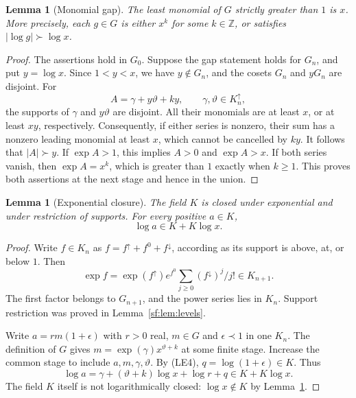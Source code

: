 \documentclass[11pt]{article}
\newtheorem{lemma}[theorem]{Lemma}
\theoremstyle{definition}
\theoremstyle{remark}
\newcommand{\up}{\uparrow}
\newcommand{\dn}{\downarrow}
\newcommand{\Z}{\mathbb Z}
\numberwithin{equation}{section}
\begin{document}
\begin{lemma}[Monomial gap]\label{sf:lem:gap}
The least monomial of $G$ strictly greater than $1$ is $x$.
More precisely, each $g\in G$ is either $x^k$ for some $k\in\Z$,
or satisfies $|\log g|\succ\log x$.
\end{lemma}
\begin{proof}
The assertions hold in $G_0$. Suppose the gap statement holds for
$G_n$, and put $y=\log x$. Since $1<y<x$, we have $y\notin G_n$,
and the cosets $G_n$ and $yG_n$ are disjoint. For
\[
 A=\gamma+y\vartheta+ky,\qquad\gamma,\vartheta\in K_n^\up,
\]
the supports of $\gamma$ and $y\vartheta$ are disjoint. All
their monomials are at least $x$, or at least $xy$, respectively.
Consequently, if either series is nonzero, their sum has a nonzero
leading monomial at least $x$, which cannot be cancelled by $ky$.
It follows that $|A|\succ y$. If $\exp A>1$, this implies
$A>0$ and $\exp A>x$. If both series vanish, then
$\exp A=x^k$, which is greater than $1$ exactly when $k\ge1$.
This proves both assertions at the next stage and hence in the union.
\end{proof}

\begin{lemma}[Exponential closure]\label{sf:lem:expclosure}
The field $K$ is closed under exponential and under restriction of
supports. For every positive $a\in K$,
\[
 \log a\in K+K\log x.
\]
\end{lemma}
\begin{proof}
Write $f\in K_n$ as $f=f^\up+f^0+f^\dn$, according as its
support is above, at, or below $1$. Then
\[
 \exp f=\exp(f^\up)e^{f^0}
                      \sum_{j\ge0}(f^\dn)^j/j!\in K_{n+1}.
\]
The first factor belongs to $G_{n+1}$, and the power series lies
in $K_n$. Support restriction was proved in Lemma~\ref{sf:lem:levels}.

Write $a=r m(1+\epsilon)$ with $r>0$ real, $m\in G$ and
$\epsilon\prec1$ in one $K_n$. The definition of $G$ gives
$m=\exp(\gamma)x^{\vartheta+k}$ at some finite stage. Increase
the common stage to include $a,m,\gamma,\vartheta$. By (LE4),
$q=\log(1+\epsilon)\in K$. Thus
\begin{equation}
 \log a=\gamma+(\vartheta+k)\log x+\log r+q
                            \in K+K\log x.\label{sf:eq:logsupport}
\end{equation}
The field $K$ itself is not logarithmically closed:
$\log x\notin K$ by Lemma~\ref{sf:lem:gap}.
\end{proof}
\end{document}
